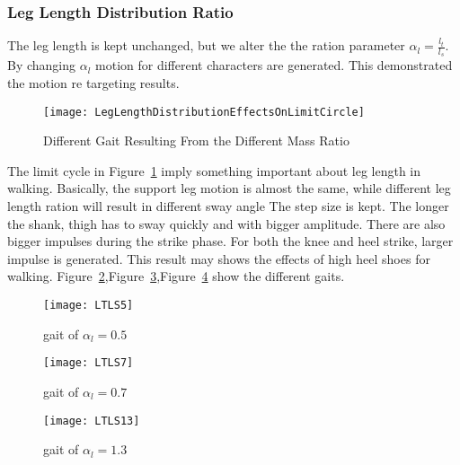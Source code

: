 \subsubsection*{Leg Length Distribution Ratio}
The leg length is kept unchanged, but we alter the the ration parameter $\alpha_l=\frac{l_t}{l_s}$.
By changing $\alpha_l$ motion for different characters are generated.
This demonstrated the motion re targeting results.


\begin{figure}[!htbp]
  \begin{center}
      \texttt{[image: LegLengthDistributionEffectsOnLimitCircle]}
    \caption{Different Gait Resulting From the Different Mass Ratio}
    \label{fig:differentlr}
\end{center}
\end{figure}

The limit cycle in Figure~\ref{fig:differentlr} imply something important about leg length in walking.
Basically, the support leg motion is almost the same, while different leg length ration will result in different sway angle
The step size is kept.
The longer the shank, thigh has to sway quickly and with bigger amplitude.
There are also bigger impulses during the strike phase. 
For both the knee and heel strike, larger impulse is generated.
This result may shows the effects of high heel shoes for walking.
Figure~\ref{fig:lr1},Figure~\ref{fig:lr2},Figure~\ref{fig:lr3} show the different gaits.



\begin{figure}[!htbp]
  \begin{center}
      \texttt{[image: LTLS5]}
    \caption{gait of $\alpha_l=0.5$}
    \label{fig:lr1}
\end{center}
\end{figure}

\begin{figure}[!htbp]
  \begin{center}
      \texttt{[image: LTLS7]}
    \caption{gait of $\alpha_l=0.7$}
    \label{fig:lr2}
\end{center}
\end{figure}

\begin{figure}[!htbp]
  \begin{center}
      \texttt{[image: LTLS13]}
    \caption{gait of $\alpha_l=1.3$}
    \label{fig:lr3}
\end{center}
\end{figure}





